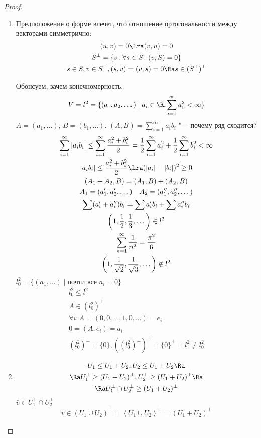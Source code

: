 \begin{proof}
\begin{enumerate}
	\item
		Предположение о форме влечет, что отношение ортогональности между векторами симметрично:
		\begin{gather*}
			(u, v) = 0 \Lra (v, u) = 0 \\
			S^\bot = \{v\colon \forall s \in S \colon (v, S) = 0\} \\
			s \in S, v \in S^\bot, (s, v) = (v, s) = 0 \Ra s \in (S^\bot)^\bot
		\end{gather*}
		\begin{exmp}
			Обонсуем, зачем конечномерность.
			\[ V = l^2 = \{(a_1, a_2, \dots) \mid a_i \in \R, \sum_{i=1}^\infty a_i^2 < \infty\} \]
			$A = (a_1, \dots)$, $B = (b_1, \dots)$.
			$(A, B) = \sum_{i = 1}^\infty a_i b_i$ "--- почему ряд сходится?
			\begin{gather*}
				\sum_{i=1}^\infty |a_i b_i|
				\le \sum_{i=1}^\infty \frac{a_i^2 + b_i^2}2 = \frac12 \sum_{i = 1}^\infty a_i^2 + \frac12\sum_{i = 1}^\infty b_i^2 < \infty \\
				|a_i b_i| \le \frac{a_i^2 + b_i^2}2 \Lra (|a_i| - |b_i|)^2 \ge 0 \\
				(A_1 + A_2, B) = (A_1, B) + (A_2, B) \\
				A_1 = (a_1', a_2', \dots) \quad A_2 = (a_1'', a_2'', \dots) \\
				\sum(a_i' + a_i'')b_i = \sum a_i'b_i + \sum a_i''b_i \\
				\left(1, \frac12, \frac13, \dots\right) \in l^2 \\
				\sum_{n = 1}^\infty \frac1{n^2} = \frac{\pi^2}6 \\
				\left(1, \frac1{\sqrt{2}}, \frac1{\sqrt{3}}, \dots\right) \notin l^2
			\end{gather*}
			$l^2_0 = \{(a_1, \dots) \mid \text{почти все $a_i = 0$}\}$
			\begin{gather*}
				l_0^2 \le l^2 \\
				A \in (l_0^2)^\bot \\
				\forall i \colon A \perp (0, 0, \dots, 1, 0, \dots) = e_i \\
				0 = (A, e_i) = a_i \\
				(l_0^2)^\bot = \{0\}, ((l_0^2)^\bot)^\bot = \{0\}^\bot = l^2 \ne l_0^2
			\end{gather*}
		\end{exmp}

	\item
		\begin{gather*}
			U_1 \le U_1 + U_2, U_2 \le U_1 + U_2 \Ra \\
			\Ra U_1^\bot \ge (U_1 + U_2)^\bot, U_2^\bot \ge (U_1 + U_2)^\bot \Ra \\
			\Ra U_1^\bot \cap U_2^\bot \ge (U_1 + U_2)^\bot
		\end{gather*}
		$\bar v \in  U_1^\bot \cap U_2^\bot$
		\begin{gather*}
			v \in (U_1 \cup U_2)^\bot = \left<U_1 \cup U_2\right>^\bot = (U_1 + U_2)^\bot
		\end{gather*}


\end{enumerate}
\end{proof}
